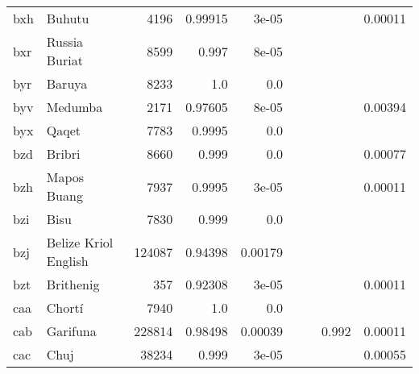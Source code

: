 \documentclass[11pt]{article}
\begin{document}
\begin{table*}[h]
{\begin{tabular}{llrrrrrrr}
bxh         & Buhutu         & 4196         & 0.99915         & 3e-05         &          &          &          & 0.00011         \\

bxr         & Russia Buriat         & 8599         & 0.997         & 8e-05         &          &          &          &          \\

byr         & Baruya         & 8233         & 1.0         & 0.0         &          &          &          &          \\

byv         & Medumba         & 2171         & 0.97605         & 8e-05         &          &          &          & 0.00394         \\

byx         & Qaqet         & 7783         & 0.9995         & 0.0         &          &          &          &          \\

bzd         & Bribri         & 8660         & 0.999         & 0.0         &          &          &          & 0.00077         \\

bzh         & Mapos Buang         & 7937         & 0.9995         & 3e-05         &          &          &          & 0.00011         \\

bzi         & Bisu         & 7830         & 0.999         & 0.0         &          &          &          &          \\

bzj         & Belize Kriol English         & 124087         & 0.94398         & 0.00179         &          &          &          &          \\

bzt         & Brithenig         & 357         & 0.92308         & 3e-05         &          &          &          & 0.00011         \\

caa         & Chortí         & 7940         & 1.0         & 0.0         &          &          &          &          \\

cab         & Garifuna         & 228814         & 0.98498         & 0.00039         &          &          & 0.992         & 0.00011         \\

cac         & Chuj         & 38234         & 0.999         & 3e-05         &          &          &          & 0.00055         \\


\end{tabular}}
\end{table*}
\end{document}
